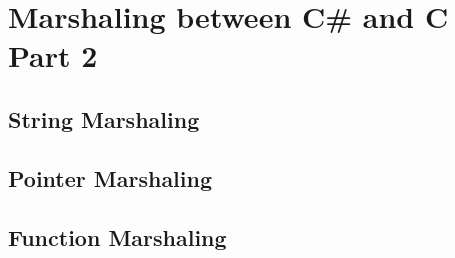 \chapter{Marshaling between C\# and C Part 2}
\section{String Marshaling}

\section{Pointer Marshaling}

\section{Function Marshaling}
